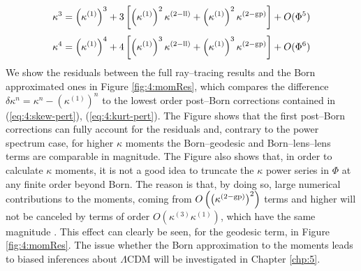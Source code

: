 \begin{equation}
\label{eq:4:skew-pert}
\kappa^3 = \left(\kappa^{(1)}\right)^3 + 3\left[\left(\kappa^{(1)}\right)^2\kappa^{(2-{\rm ll})} + \left(\kappa^{(1)}\right)^2\kappa^{(2-{\rm gp})} \right] + O(\Phi^5)
\end{equation}
%
\begin{equation}
\label{eq:4:kurt-pert}
\kappa^4 = \left(\kappa^{(1)}\right)^4 + 4\left[\left(\kappa^{(1)}\right)^3\kappa^{(2-{\rm ll})} + \left(\kappa^{(1)}\right)^3\kappa^{(2-{\rm gp})} \right] + O(\Phi^6)
\end{equation}
%
We show the residuals between the full ray--tracing results and the Born approximated ones in Figure \ref{fig:4:momRes}, which compares the difference $\delta{\kappa}^n=\kappa^n - \left(\kappa^{(1)}\right)^n$ to the lowest order post--Born corrections contained in (\ref{eq:4:skew-pert}), (\ref{eq:4:kurt-pert}). The Figure shows that the first post--Born corrections can fully account for the residuals and, contrary to the power spectrum case, for higher $\kappa$ moments the Born--geodesic and Born--lens--lens terms are comparable in magnitude. The Figure also shows that, in order to calculate $\kappa$ moments, it is not a good idea to truncate the $\kappa$ power series in $\Phi$ at any finite order beyond Born. The reason is that, by doing so, large numerical contributions to the moments, coming from $O\left(\left(\kappa^{(2-{\rm gp})}\right)^2\right)$ terms and higher will not be canceled by terms of order $O\left(\kappa^{(3)}\kappa^{(1)}\right)$, which have the same magnitude \citep{HirataKrause}. This effect can clearly be seen, for the geodesic term, in Figure \ref{fig:4:momRes}. The issue whether the Born approximation to the moments leads to biased inferences about $\Lambda$CDM will be investigated in Chapter \ref{chp:5}. 


